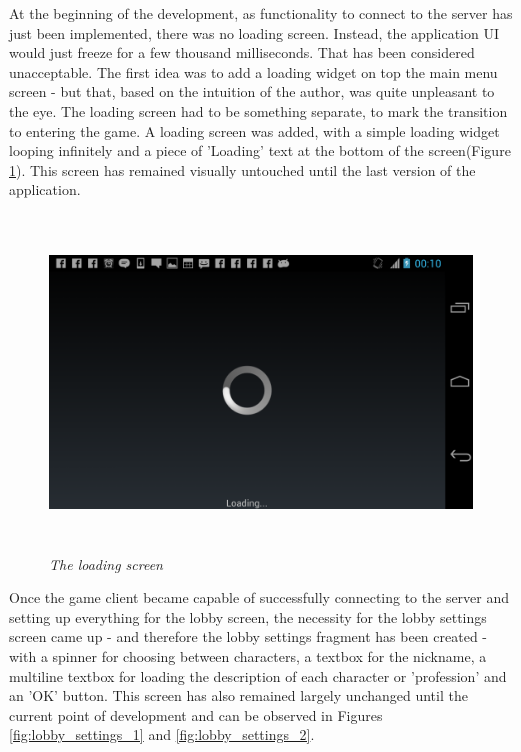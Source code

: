 At the beginning of the development, as functionality to connect to the server
has just been implemented, there was no loading screen. Instead, the application
UI would just freeze for a few thousand milliseconds. That has been considered
unacceptable. The first idea was to add a loading widget on top the main menu
screen - but that, based on the intuition of the author, was quite unpleasant to
the eye. The loading screen had to be something separate, to mark the transition
to entering the game. A loading screen was added, with a simple loading widget
looping infinitely and a piece of 'Loading' text at the bottom of the
screen(Figure \ref{fig:loading}). This screen has remained visually untouched
until the last version of the application.\newline

\begin{figure}
\includegraphics[height=3.5in,width=6.23in]{./images/android_screenshots/tutorial_loading.png}
\caption{\small \sl The loading screen\label{fig:loading}}
\end{figure}

Once the game client became capable of successfully connecting to the server and
setting up everything for the lobby screen, the necessity for the lobby settings
screen came up - and therefore the lobby settings fragment has been created -
with a spinner for choosing between characters, a textbox for the nickname, a
multiline textbox for loading the description of each character or 'profession'
and an 'OK' button. This screen has also remained largely unchanged until the
current point of development and can be observed in Figures
\ref{fig:lobby_settings_1} and \ref{fig:lobby_settings_2}.

